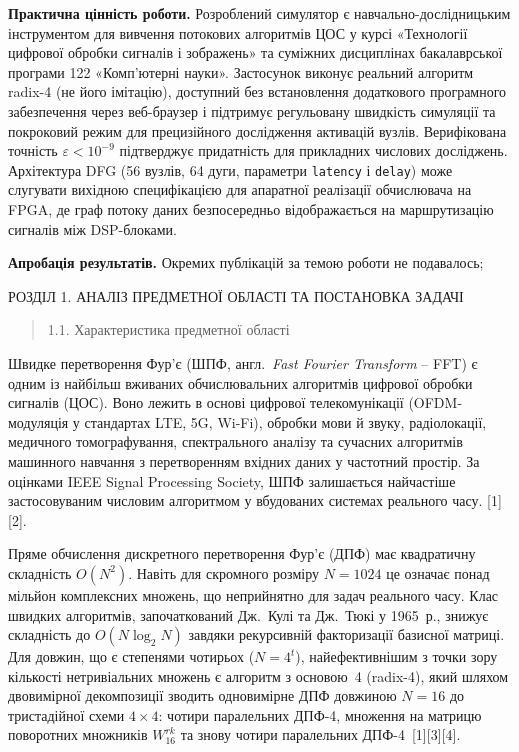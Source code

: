 \documentclass[
]{article}
\begin{document}
\textbf{Практична цінність роботи.} Розроблений симулятор є
навчально-дослідницьким інструментом для вивчення потокових алгоритмів
ЦОС у курсі «Технології цифрової обробки сигналів і зображень» та
суміжних дисциплінах бакалаврської програми 122 «Комп'ютерні науки».
Застосунок виконує реальний алгоритм radix-4 (не його імітацію),
доступний без встановлення додаткового програмного забезпечення через
веб-браузер і підтримує регульовану швидкість симуляції та покроковий
режим для прецизійного дослідження активацій вузлів. Верифікована
точність \(\varepsilon < 10^{- 9}\) підтверджує придатність для
прикладних числових досліджень. Архітектура DFG (56 вузлів, 64 дуги,
параметри \texttt{latency} і \texttt{delay}) може слугувати вихідною
специфікацією для апаратної реалізації обчислювача на FPGA, де граф
потоку даних безпосередньо відображається на маршрутизацію сигналів між
DSP-блоками.

\textbf{Апробація результатів.} Окремих публікацій за темою роботи не
подавалось;

\protect{}\label{_Toc230130251}{}РОЗДІЛ 1. АНАЛІЗ
ПРЕДМЕТНОЇ ОБЛАСТІ ТА ПОСТАНОВКА ЗАДАЧІ

\begin{quote}
\protect{}\label{ux445ux430ux440ux430ux43aux442ux435ux440ux438ux441ux442ux438ux43aux430-ux43fux440ux435ux434ux43cux435ux442ux43dux43eux457-ux43eux431ux43bux430ux441ux442ux456}{}1.1.
Характеристика предметної області
\end{quote}

Швидке перетворення Фур'є (ШПФ, англ.~\emph{Fast Fourier Transform} --
FFT) є одним із найбільш вживаних обчислювальних алгоритмів цифрової
обробки сигналів (ЦОС). Воно лежить в основі цифрової телекомунікації
(OFDM-модуляція у стандартах LTE, 5G, Wi-Fi), обробки мови й звуку,
радіолокації, медичного томографування, спектрального аналізу та
сучасних алгоритмів машинного навчання з перетворенням вхідних даних у
частотний простір. За оцінками IEEE Signal Processing Society, ШПФ
залишається найчастіше застосовуваним числовим алгоритмом у вбудованих
системах реального часу. {[}1{]}{[}2{]}.

Пряме обчислення дискретного перетворення Фур'є (ДПФ) має квадратичну
складність \(O(N^{2})\). Навіть для скромного розміру \(N = 1024\) це
означає понад мільйон комплексних множень, що неприйнятно для задач
реального часу. Клас швидких алгоритмів, започаткований Дж.~Кулі та
Дж.~Тюкі у 1965~р., знижує складність до \(O(N\log_{2}N)\) завдяки
рекурсивній факторизації базисної матриці. Для довжин, що є степенями
чотирьох (\(N = 4^{t}\)), найефективнішим з точки зору кількості
нетривіальних множень є алгоритм з основою~4 (radix-4), який шляхом
двовимірної декомпозиції зводить одновимірне ДПФ довжиною \(N = 16\) до
тристадійної схеми \(4 \times 4\): чотири паралельних ДПФ-4, множення на
матрицю поворотних множників \(W_{16}^{rk}\) та знову чотири паралельних
ДПФ-4~{[}1{]}{[}3{]}{[}4{]}.
\end{document}
